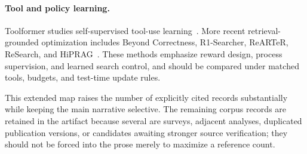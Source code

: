 \paragraph{Tool and policy learning.}
Toolformer studies self-supervised tool-use learning~\cite{extFL014}. More recent retrieval-grounded optimization includes Beyond Correctness, R1-Searcher, ReARTeR, ReSearch, and HiPRAG~\cite{extFL024,extFL025,extFL027,extFL028,extFL030}. These methods emphasize reward design, process supervision, and learned search control, and should be compared under matched tools, budgets, and test-time update rules.

This extended map raises the number of explicitly cited records substantially while keeping the main narrative selective. The remaining corpus records are retained in the artifact because several are surveys, adjacent analyses, duplicated publication versions, or candidates awaiting stronger source verification; they should not be forced into the prose merely to maximize a reference count.
